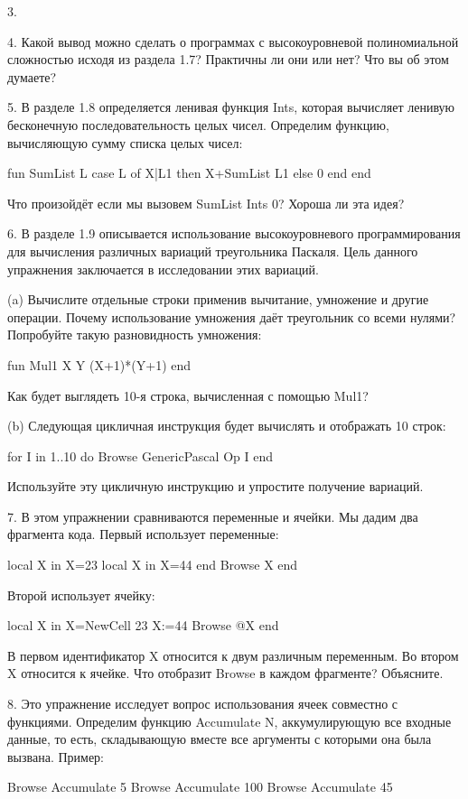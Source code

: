 3. 

4. Какой вывод можно сделать о программах с высокоуровневой полиномиальной сложностью исходя из раздела 1.7? Практичны ли они или нет? Что вы об этом думаете?

5. В разделе 1.8 определяется ленивая функция Ints, которая вычисляет ленивую бесконечную последовательность целых чисел. Определим функцию, вычисляющую сумму списка целых чисел:

fun {SumList L}
case L of X|L1 then X+{SumList L1}
else 0 end
end

Что произойдёт если мы вызовем {SumList {Ints 0}}? Хороша ли эта идея?

6. В разделе 1.9 описывается использование высокоуровневого программирования для вычисления различных вариаций треугольника Паскаля. Цель данного упражнения заключается в исследовании этих вариаций.

(a) Вычислите отдельные строки применив вычитание, умножение и другие операции. Почему использование умножения даёт треугольник со всеми нулями? Попробуйте такую разновидность умножения:

fun {Mul1 X Y} (X+1)*(Y+1) end

Как будет выглядеть 10-я строка, вычисленная с помощью Mul1?

(b) Следующая цикличная инструкция будет вычислять и отображать 10 строк:

for I in 1..10 do {Browse {GenericPascal Op I}} end

Используйте эту цикличную инструкцию и упростите получение вариаций.

7. В этом упражнении сравниваются переменные и ячейки. Мы дадим два фрагмента кода. Первый использует переменные:

local X in
X=23
local X in
X=44
end
{Browse X}
end

Второй использует ячейку:

local X in
X={NewCell 23}
X:=44
{Browse @X}
end

В первом идентификатор X относится к двум различным переменным. Во втором X относится к ячейке. Что отобразит Browse в каждом фрагменте? Объясните.

8. Это упражнение исследует вопрос использования ячеек совместно с функциями. Определим функцию {Accumulate N}, аккумулирующую все входные данные, то есть, складывающую вместе все аргументы с которыми она была вызвана. Пример:

{Browse {Accumulate 5}}
{Browse {Accumulate 100}}
{Browse {Accumulate 45}}

